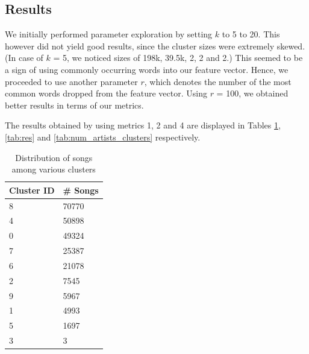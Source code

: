 \documentclass[10pt,a4paper, twocolumn]{article}
\begin{document}
  \subsection{Results}
  We initially performed parameter exploration by setting $k$ to 5 to 20.
  This however did not yield good results, since the cluster sizes were extremely skewed.
  (In case of $k$ = 5, we noticed sizes of 198k, 39.5k, 2, 2 and 2.)
  This seemed to be a sign of using commonly occurring words into our feature vector.
  Hence, we proceeded to use another parameter $r$, which denotes the number of the most common words dropped from the feature vector.
  Using $r$ = 100, we obtained better results in terms of our metrics.
  
  The results obtained by using metrics 1, 2 and 4 are displayed in Tables \ref{tab:song_dis}, \ref{tab:res} and \ref{tab:num_artists_clusters} respectively.
  
\begin{table}
\centering
\caption{Distribution of songs among various clusters}
\begin{tabular}{@{}ll@{}}
\toprule
Cluster ID & \# Songs \\ \midrule
8           & 70770      \\
4           & 50898      \\
0           & 49324      \\
7           & 25387      \\
6           & 21078      \\
2           & 7545       \\
9           & 5967       \\
1           & 4993       \\
5           & 1697       \\
3           & 3          \\ \bottomrule
\end{tabular}
\label{tab:song_dis}
\end{table}
  
\end{document}

